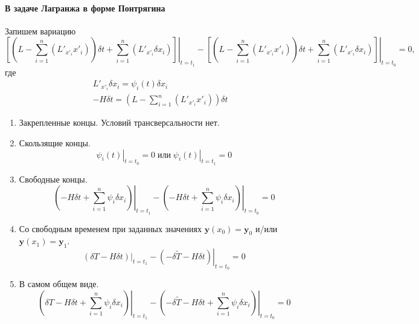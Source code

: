 \paragraph{В задаче Лагранжа в форме Понтрягина}
Запишем вариацию
\begin{equation*}
		\left.\left[ \left(L-\sum_{i=1}^{n}\left(L'_{x'_i}x'_i\right)\right)\delta t + \sum_{i=1}^{n}\left(L'_{x'_i}\delta x_i\right) \right]\right|_{t=t_1}-
		\left.\left[ \left(L-\sum_{i=1}^{n}\left(L'_{x'_i}x'_i\right)\right)\delta t + \sum_{i=1}^{n}\left(L'_{x'_i}\delta x_i\right) \right]\right|_{t=t_0}=0,
\end{equation*}
где
\begin{align*}
	&L'_{x'_i}\delta x_i=\psi_i(t)\delta x_i\\
	& -H\delta t = \left(L-\sum_{i=1}^{n}\left(L'_{x'_i}x'_i\right)\right)\delta t
\end{align*}
\begin{enumerate}
	\item Закрепленные концы. Условий трансверсальности нет.
	\item Скользящие концы. 
	\begin{equation*}
		\left.\psi_i(t)\right|_{t=t_0} = 0\;\text{или}\;\left.\psi_i(t)\right|_{t=t_1} = 0
	\end{equation*}
	\item Свободные концы.
	\begin{equation*}
		\left.\left(-H\delta t + \sum_{i=1}^{n}\psi_i\delta x_i\right)\right|_{t=t_1}-\left.\left(-H\delta t + \sum_{i=1}^{n}\psi_i\delta x_i\right)\right|_{t=t_0}=0
	\end{equation*}
	\item Со свободным временем при заданных значениях $\mathbf{y}(x_0)=\mathbf{y}_0$ и/или $\mathbf{y}(x_1)=\mathbf{y}_1$.
	\begin{equation*}
		\left.\left(\delta T-H\delta t\right)\right|_{t=t_1}-\left.\left(-\delta\tilde{T}-H\delta t \right)\right|_{t=t_0}=0
	\end{equation*}
	\item В самом общем виде.
	\begin{equation*}
		\left.\left(\delta T-H\delta t+ \sum_{i=1}^{n}\psi_i\delta x_i\right)\right|_{t=t_1}-\left.\left(-\delta\tilde{T}-H\delta t+ \sum_{i=1}^{n}\psi_i\delta x_i \right)\right|_{t=t_0}=0
	\end{equation*}
\end{enumerate}